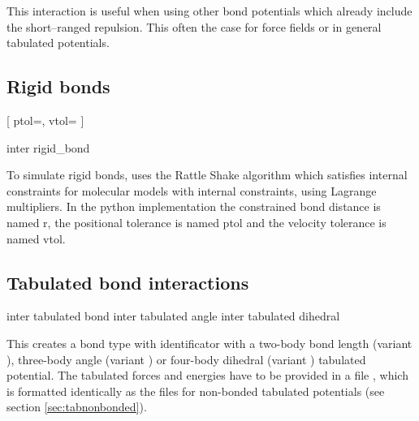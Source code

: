 This interaction is useful when using other bond potentials which already
include the short--ranged repulsion. This often the case for force fields or in
general tabulated potentials.

\subsection{Rigid bonds}
\label{sec:rattle}

\PythonSyntaxOn
\begin{pysyntax}
[
	ptol=,
	vtol=
]
\end{pysyntax}
 \PythonSyntaxOff

\begin{essyntax}
  inter 
  rigid_bond
    
  \begin{features}
  \end{features}
\end{essyntax}

To simulate rigid bonds, \es uses the Rattle Shake algorithm which
satisfies internal constraints for molecular models with internal
constraints, using Lagrange multipliers.\cite{andersen83a}
In the python implementation the constrained bond distance is named r, the positional tolerance is named ptol and the velocity tolerance is named vtol.

\subsection{Tabulated bond interactions}

\begin{essyntax}
     inter 
    tabulated bond 
     inter 
    tabulated angle 
     inter 
    tabulated dihedral 
\end{essyntax}

This creates a bond type with identificator  with a
two-body bond length (variant ), three-body angle (variant
) or four-body dihedral (variant ) tabulated
potential. The tabulated forces and energies have to be provided in a
file , which is formatted identically as the files for
non-bonded tabulated potentials (see section \ref{sec:tabnonbonded}).


